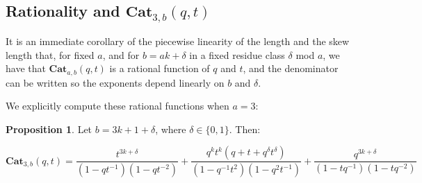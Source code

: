 \documentclass{amsart}[12pt]
\theoremstyle{definition}
\newtheorem{proposition}[dummy]{Proposition}
\newcommand{\Cat}{\mathbf{Cat}}
\begin{document}
\subsection{Rationality and \texorpdfstring{$\Cat_{3,b}(q,t)$}{Cat{3,b}(q,t)}}

It is an immediate corollary of the piecewise linearity of the length and the skew length that, for fixed $a$, and for $b=ak+\delta$ in a fixed residue class $\delta$ mod $a$, we have that $\Cat_{a,b}(q,t)$ is a rational function of $q$ and $t$, and the denominator can be written so the exponents depend linearly on $b$ and $\delta$.

We explicitly compute these rational functions when $a=3$:

\begin{proposition} \label{prop:qt3}
Let $b=3k+1+\delta$, where $\delta\in\{0,1\}$.  Then:

$$\Cat_{3,b}(q,t)=\frac{t^{3k+\delta}}{(1-qt^{-1})(1-qt^{-2})}+\frac{q^kt^k(q+t+q^\delta t^\delta)}{(1-q^{-1}t^2)(1-q^2t^{-1})}+\frac{q^{3k+\delta}}{(1-tq^{-1})(1-tq^{-2})}$$

\end{proposition}
\end{document}
